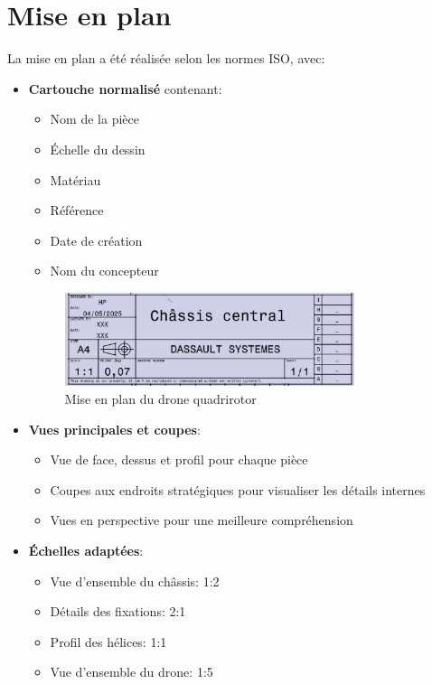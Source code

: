 \documentclass[a4paper,12pt]{report}
\begin{document}
\section{Mise en plan}
La mise en plan a été réalisée selon les normes ISO, avec:

\begin{itemize}
    \item \textbf{Cartouche normalisé} contenant:
    \begin{itemize}
        \item Nom de la pièce
        \item Échelle du dessin
        \item Matériau
        \item Référence
        \item Date de création
        \item Nom du concepteur
    \end{itemize}
    
    \begin{figure}[H]
        \centering
        \includegraphics[width=0.8\textwidth]{images/mise_en_plan_drone.png}
        \caption{Mise en plan du drone quadrirotor}
        \label{fig:mise_en_plan_drone}
    \end{figure}
    
    \item \textbf{Vues principales et coupes}:
    \begin{itemize}
        \item Vue de face, dessus et profil pour chaque pièce
        \item Coupes aux endroits stratégiques pour visualiser les détails internes
        \item Vues en perspective pour une meilleure compréhension
    \end{itemize}
    
    \item \textbf{Échelles adaptées}:
    \begin{itemize}
        \item Vue d'ensemble du châssis: 1:2
        \item Détails des fixations: 2:1
        \item Profil des hélices: 1:1
        \item Vue d'ensemble du drone: 1:5
    \end{itemize}
\end{itemize}
\end{document}

